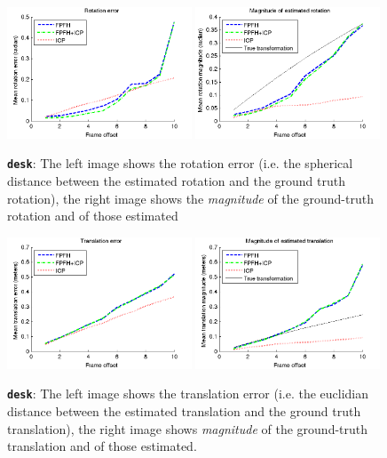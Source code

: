 \documentclass[a4paper]{article}
\begin{document}
\begin{figure}[H]
    \centering
        \includegraphics[width=0.49\textwidth]{ims/deskRotationerror.png}
        \includegraphics[width=0.49\textwidth]{ims/deskMagnitudeofestimatedrotation.png}
    \caption{\textbf{\texttt{desk}}: The left image shows the rotation error (i.e. the spherical distance between the estimated rotation and the ground truth rotation), the right image shows the \emph{magnitude} of the ground-truth rotation and of those estimated}
    \label{fig:desk_rotation}
\end{figure}

\begin{figure}[H]
    \centering
        \includegraphics[width=0.49\textwidth]{ims/deskTranslationerror.png}
        \includegraphics[width=0.49\textwidth]{ims/deskMagnitudeofestimatedtranslation.png}
    \caption{\textbf{\texttt{desk}}: The left image shows the translation error (i.e. the euclidian distance between the estimated translation and the ground truth translation), the right image shows \emph{magnitude} of the ground-truth translation and of those estimated.}
    \label{fig:desk_translation}
\end{figure}
\end{document}
